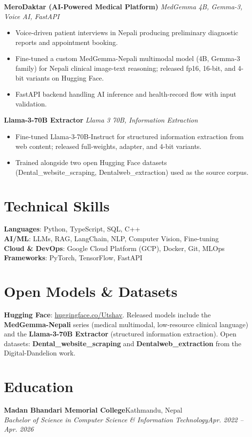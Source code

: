 \documentclass[11pt,a4paper]{article}
\newcommand{\role}[4]{%
  \noindent\textbf{#1}\hfill #2\\[1pt]
  \textit{#3}\hfill \textit{#4}\par
  \vspace{2pt}
}
\newenvironment{bullets}{%
  \vspace{-2pt}
  \begin{itemize}[leftmargin=14pt, itemsep=1pt, topsep=2pt, label={\textbullet}]
}{\end{itemize}\vspace{3pt}}
\newcommand{\project}[2]{%
  \noindent\textbf{#1} \textbar{} \textit{#2}\par\vspace{1pt}
}
\begin{document}
\project{MeroDaktar (AI-Powered Medical Platform)}{MedGemma 4B, Gemma-3, Voice AI, FastAPI}
\begin{bullets}
  \item Voice-driven patient interviews in Nepali producing preliminary diagnostic reports and appointment booking.
  \item Fine-tuned a custom MedGemma-Nepali multimodal model (4B, Gemma-3 family) for Nepali clinical image-text reasoning; released fp16, 16-bit, and 4-bit variants on Hugging Face.
  \item FastAPI backend handling AI inference and health-record flow with input validation.
\end{bullets}

\project{Llama-3-70B Extractor}{Llama 3 70B, Information Extraction}
\begin{bullets}
  \item Fine-tuned Llama-3-70B-Instruct for structured information extraction from web content; released full-weights, adapter, and 4-bit variants.
  \item Trained alongside two open Hugging Face datasets (Dental\_website\_scraping, Dentalweb\_extraction) used as the source corpus.
\end{bullets}

\section*{Technical Skills}
\textbf{Languages}: Python, TypeScript, SQL, C++\\
\textbf{AI/ML}: LLMs, RAG, LangChain, NLP, Computer Vision, Fine-tuning\\
\textbf{Cloud \& DevOps}: Google Cloud Platform (GCP), Docker, Git, MLOps\\
\textbf{Frameworks}: PyTorch, TensorFlow, FastAPI

\section*{Open Models \& Datasets}
\textbf{Hugging Face}: \href{https://huggingface.co/Utshav}{huggingface.co/Utshav}. Released models include the \textbf{MedGemma-Nepali} series (medical multimodal, low-resource clinical language) and the \textbf{Llama-3-70B Extractor} (structured information extraction). Open datasets: \textbf{Dental\_website\_scraping} and \textbf{Dentalweb\_extraction} from the Digital-Dandelion work.

\section*{Education}
\role{Madan Bhandari Memorial College}{Kathmandu, Nepal}%
     {Bachelor of Science in Computer Science \& Information Technology}{Apr. 2022 -- Apr. 2026}
\end{document}
